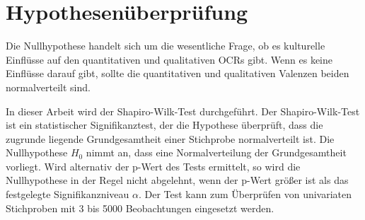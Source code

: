 \section{Hypothesenüberprüfung} \label{sec:h0}
Die Nullhypothese handelt sich um die wesentliche Frage, ob es kulturelle Einflüsse auf den quantitativen und qualitativen \ac{OCRs} gibt. Wenn es keine Einflüsse darauf gibt, sollte die quantitativen und qualitativen Valenzen beiden normalverteilt sind. 

In dieser Arbeit wird der Shapiro-Wilk-Test durchgeführt. Der Shapiro-Wilk-Test ist ein statistischer Signifikanztest, der die Hypothese überprüft, dass die zugrunde liegende Grundgesamtheit einer Stichprobe normalverteilt ist. Die Nullhypothese $H_0$ nimmt an, dass eine Normalverteilung der Grundgesamtheit vorliegt. Wird alternativ der p-Wert des Tests ermittelt, so wird die Nullhypothese in der Regel nicht abgelehnt, wenn der p-Wert größer ist als das festgelegte Signifikanzniveau $\alpha$. Der Test kann zum Überprüfen von univariaten Stichproben mit 3 bis 5000 Beobachtungen eingesetzt werden. \citep{SHAPIRO01121965}

